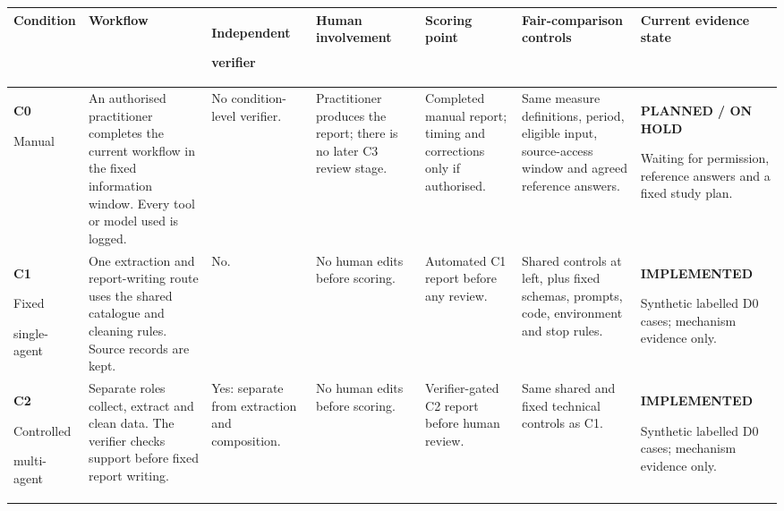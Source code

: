 \clearpage
\begin{table}[p]
  \centering
  \scriptsize
  \setlength{\tabcolsep}{0.8pt}
  \renewcommand{\arraystretch}{1.18}
  \begin{tabularx}{\textwidth}{@{}P{0.12\textwidth}P{0.155\textwidth}P{0.125\textwidth}P{0.10\textwidth}P{0.115\textwidth}Y P{0.172\textwidth}@{}}
    \toprule
    \textbf{Condition} &
    \textbf{Workflow} &
    \textbf{Independent}\par\textbf{verifier} &
    \textbf{Human involvement} &
    \textbf{Scoring point} &
    \textbf{Fair-comparison controls} &
    \textbf{Current evidence state} \\
    \midrule

    \textbf{C0}\par Manual &
    An authorised practitioner completes the current workflow in the fixed information window. Every tool or model used is logged. &
    No condition-level verifier. &
    Practitioner produces the report; there is no later C3 review stage. &
    Completed manual report; timing and corrections only if authorised. &
    Same measure definitions, period, eligible input, source-access window and agreed reference answers. &
    \textbf{PLANNED / ON HOLD}\par Waiting for permission, reference answers and a fixed study plan. \\

    \addlinespace[2pt]
    \textbf{C1}\par Fixed\par single-agent &
    One extraction and report-writing route uses the shared catalogue and cleaning rules. Source records are kept. &
    No. &
    No human edits before scoring. &
    Automated C1 report before any review. &
    Shared controls at left, plus fixed schemas, prompts, code, environment and stop rules. &
    \textbf{IMPLEMENTED}\par Synthetic labelled D0 cases; mechanism evidence only. \\

    \addlinespace[2pt]
    \textbf{C2}\par Controlled\par multi-agent &
    Separate roles collect, extract and clean data. The verifier checks support before fixed report writing. &
    Yes: separate from extraction and composition. &
    No human edits before scoring. &
    Verifier-gated C2 report before human review. &
    Same shared and fixed technical controls as C1. &
    \textbf{IMPLEMENTED}\par Synthetic labelled D0 cases; mechanism evidence only. \\


\end{tabularx}
\end{table}
